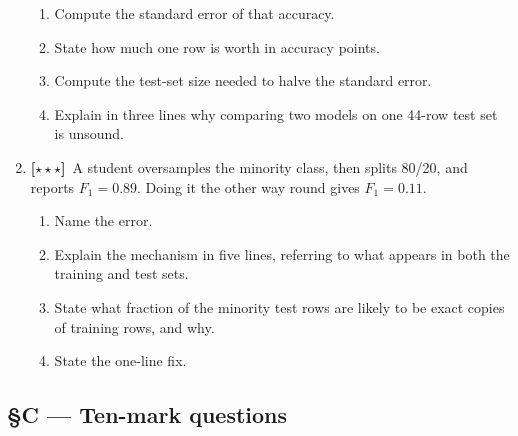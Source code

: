 \documentclass[11pt,a4paper]{article}
\newcommand{\LA}{{\footnotesize\textbf{[$\star\star\star$]}}}
\newcommand{\Q}[1]{\item[\textbf{#1}]}
\begin{document}
\begin{enumerate}[leftmargin=2.2cm]
  \begin{enumerate}[label=(\alph*)]
    \item Compute the standard error of that accuracy.
    \item State how much one row is worth in accuracy points.
    \item Compute the test-set size needed to halve the standard error.
    \item Explain in three lines why comparing two models on one 44-row test
      set is unsound.
  \end{enumerate}
\Q{U4.76}\LA\ A student oversamples the minority class, then splits 80/20, and
  reports $F_1 = 0.89$. Doing it the other way round gives $F_1 = 0.11$.
  \begin{enumerate}[label=(\alph*)]
    \item Name the error.
    \item Explain the mechanism in five lines, referring to what appears in
      both the training and test sets.
    \item State what fraction of the minority test rows are likely to be exact
      copies of training rows, and why.
    \item State the one-line fix.
  \end{enumerate}
\end{enumerate}

\subsection*{§C --- Ten-mark questions}
\end{document}
